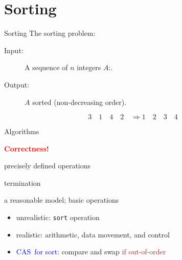 \section{Sorting}

\begin{frame}{Sorting}
  The sorting problem:
  \begin{description}
	\item[Input:] A sequence of $n$ integers $A$:.
	\item[Output:] $A$ sorted {\small (non-decreasing order)}.
  \end{description}

  \[
	3\quad 1\quad 4\quad 2\quad \Longrightarrow 1\quad 2\quad 3\quad 4
  \]


\end{frame}
\begin{frame}{Algorithms}

  \pause
  \begin{center}
	\textcolor{red}{\bf Correctness!}
  \end{center}

  \pause

  \begin{description}[Effectiveness:]
	\item[Definiteness:] precisely defined operations
	  \pause
	\item[Finiteness:] termination
	  \pause
	\item[Effectiveness:] a reasonable model; basic operations %
	  \pause
	  \begin{itemize}
		\item unrealistic: \texttt{sort} operation
		\item realistic: arithmetic, data movement, and control
		  \pause
		\item \textcolor{blue}{CAS\footnotemark~for sort:} compare and swap \textcolor{brown}{if out-of-order}
	  \end{itemize}
  \end{description}
\end{frame}
